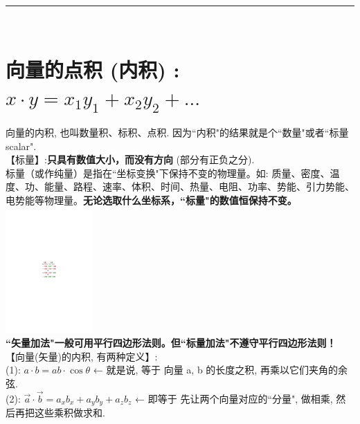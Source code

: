 \documentclass[UTF8]{ctexart}
\begin{document}
~\\
\hrule
~\\
\section{向量的点积 (内积) : $x \cdot y = x_{1} y_{1} + x_{2} y_{2} + ...$}

向量的内积, 也叫数量积、标积、点积. 因为``内积"的结果就是个``数量"或者``标量 scalar".\\

【标量】:\textbf{只具有数值大小，而没有方向} (部分有正负之分). \\
标量（或作纯量）是指在``坐标变换"下保持不变的物理量。如: 质量、密度、温度、功、能量、路程、速率、体积、时间、热量、电阻、功率、势能、引力势能、电势能等物理量。\textbf{无论选取什么坐标系，``标量"的数值恒保持不变。}\\

\includegraphics[width=0.25\textwidth]{img/0126.pdf}\\

\textbf{``矢量加法"一般可用平行四边形法则。但``标量加法"不遵守平行四边形法则！}\\


【向量(矢量)的内积, 有两种定义】:  \\
(1): $ \boxed{
a\cdot b=ab\cdot \cos \theta 
}$  ← 就是说, 等于 向量 a, b 的长度之积, 再乘以它们夹角的余弦. \\

(2): $\boxed{
	\overrightarrow{a}\cdot \overrightarrow{b}=a_xb_x+a_yb_y+a_zb_z
	}$ ← 即等于 先让两个向量对应的``分量", 做相乘, 然后再把这些乘积做求和. \\
\end{document}
